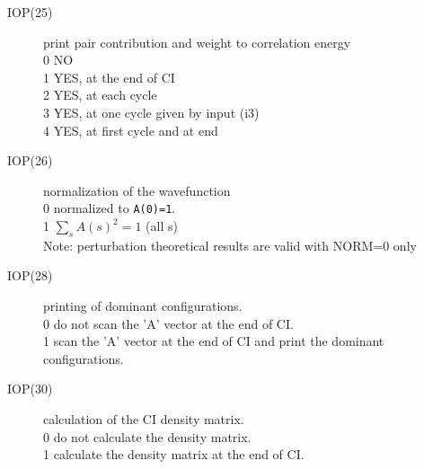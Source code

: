 \begin{description}
\item[IOP(25)]  print pair contribution and weight to correlation energy  \\
0  NO \\
1  YES, at the end of CI \\
2  YES, at each cycle \\
3  YES, at one cycle given by input (i3) \\
4  YES, at first cycle and at end \\
\item[IOP(26)]  normalization of the wavefunction  \\
0  normalized to {\tt A(0)=1}. \\
1  $\sum_s A(s)^2 = 1$ (all s) \\
Note: perturbation theoretical results are valid with NORM=0 only
\item[IOP(28)]  printing of dominant configurations.  \\
0  do not scan the 'A' vector at the end of CI. \\
1  scan the 'A' vector at the end of CI and print the 
dominant configurations.  \\
\item[IOP(30)]  calculation of the CI density matrix.  \\
0  do not calculate the density matrix. \\
1  calculate the density matrix at the end of CI. \\
\end{description}


